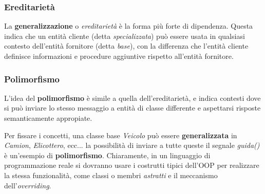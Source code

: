 \documentclass[a4paper,11pt]{article}
\begin{document}
\subsubsection{Ereditarietà}
La \textbf{generalizzazione} o \textit{ereditarietà} è la forma più forte di dipendenza.
Questa indica che un entità cliente (detta \textit{specializzata}) può essere usata in qualsiasi contesto dell'entità fornitore (detta \textit{base}), con la differenza che l'entità cliente definisce informazioni e procedure aggiuntive rispetto all'entità fornitore.

\subsubsection{Polimorfismo}
L'idea del \textbf{polimorfismo} è simile a quella dell'ereditarietà, e indica contesti dove si può inviare lo stesso messaggio a entità di classe differente e aspettarsi risposte semanticamente appropiate.

Per fissare i concetti, una classe base \textit{Veicolo} può essere \textbf{generalizzata} in \textit{Camion}, \textit{Elicottero}, ecc... la possibilità di inviare a tutte queste il segnale \textit{guida()} è un'esempio di \textbf{polimorfismo}.
Chiaramente, in un linguaggio di programmazione reale si dovranno usare i costrutti tipici dell'OOP per realizzare la stessa funzionalità, come classi o membri \textit{astratti} e il meccanismo dell'\textit{overriding}.
\end{document}
